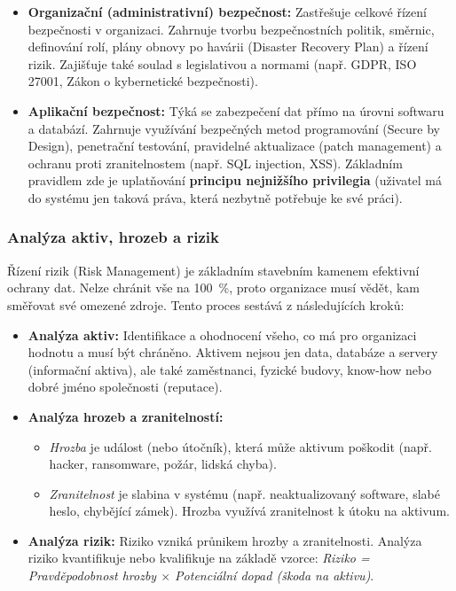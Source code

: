\begin{itemize}
    \item \textbf{Organizační (administrativní) bezpečnost:} Zastřešuje celkové řízení bezpečnosti v organizaci. Zahrnuje tvorbu bezpečnostních politik, směrnic, definování rolí, plány obnovy po havárii (Disaster Recovery Plan) a řízení rizik. Zajišťuje také soulad s legislativou a normami (např. GDPR, ISO 27001, Zákon o kybernetické bezpečnosti).

    \item \textbf{Aplikační bezpečnost:} Týká se zabezpečení dat přímo na úrovni softwaru a databází. Zahrnuje využívání bezpečných metod programování (Secure by Design), penetrační testování, pravidelné aktualizace (patch management) a ochranu proti zranitelnostem (např. SQL injection, XSS). Základním pravidlem zde je uplatňování \textbf{principu nejnižšího privilegia} (uživatel má do systému jen taková práva, která nezbytně potřebuje ke své práci).
\end{itemize}

\subsubsection*{Analýza aktiv, hrozeb a rizik}
Řízení rizik (Risk Management) je základním stavebním kamenem efektivní ochrany dat. Nelze chránit vše na 100~\%, proto organizace musí vědět, kam směřovat své omezené zdroje. Tento proces sestává z následujících kroků:
\begin{itemize}
    \item \textbf{Analýza aktiv:} Identifikace a ohodnocení všeho, co má pro organizaci hodnotu a musí být chráněno. Aktivem nejsou jen data, databáze a servery (informační aktiva), ale také zaměstnanci, fyzické budovy, know-how nebo dobré jméno společnosti (reputace).
    \item \textbf{Analýza hrozeb a zranitelností:} 
    \begin{itemize}
        \item \textit{Hrozba} je událost (nebo útočník), která může aktivum poškodit (např. hacker, ransomware, požár, lidská chyba).
        \item \textit{Zranitelnost} je slabina v systému (např. neaktualizovaný software, slabé heslo, chybějící zámek). Hrozba využívá zranitelnost k útoku na aktivum.
    \end{itemize}
    \item \textbf{Analýza rizik:} Riziko vzniká průnikem hrozby a zranitelnosti. Analýza riziko kvantifikuje nebo kvalifikuje na základě vzorce: \textit{Riziko = Pravděpodobnost hrozby $\times$ Potenciální dopad (škoda na aktivu)}.
\end{itemize}


